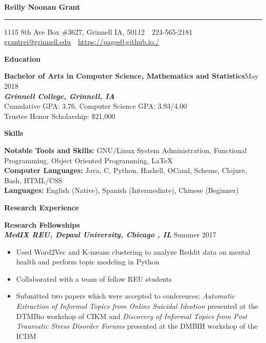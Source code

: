 \documentclass[9pt]{extarticle}
\begin{document}
\sffamily
\begin{huge}
\begin{center}
\textbf{Reilly Noonan Grant}
\end{center}
\end{huge}
\rule{19cm}{0.4pt}
\begin{center}
  1115 8th Ave Box \#3627, Grinnell IA, 50112
\,\textbullet\, 224-565-2181 \,\textbullet\, \href{mailto:grantrei@grinnell.edu}{grantrei@grinnell.edu} \,\textbullet\, \href{https://pages0.github.io./}{https://pages0.github.io./}
\end{center}

\begin{large}
\begin{center}\textbf{Education}
\end{center}
\end{large}
\textbf{Bachelor of Arts in Computer Science, Mathematics and Statistics}\hfill May 2018\\
\textbf{\textit{Grinnell College, Grinnell, IA}}\\
Cumulative GPA: 3.76, Computer Science GPA: 3.93/4.00  \\
Trustee Honor Scholarship: \$21,000 \\

\begin{large}
\begin{center}\textbf{Skills}
\end{center}
\end{large}
\textbf{Notable Tools and Skills:} GNU/Linux System Administration,
Functional Programming, Object Oriented Programming, \LaTeX  \\
\textbf{Computer Languages:} Java, C, Python, Haskell, OCaml, Scheme, Clojure, Bash,
HTML/CSS\\
\textbf{Languages:} English (Native), Spanish (Intermediate), Chinese
(Beginner) \\

\begin{large}
\begin{center}\textbf{Research Experience}
\end{center}
\end{large}
\textbf{Research Fellowships}\\
\textbf{\textit{MedIX REU, Depaul University, Chicago , IL}}
\hfill Summer 2017
\begin{itemize}
\item Used Word2Vec and K-means clustering to analyze Reddit data on
  mental health and perform topic modeling in Python
\item Collaborated with a team of fellow REU students
\item Submitted two papers which were accepted to conferences: \textit{Automatic
  Extraction of Informal Topics from Online Suicidal Ideation} 
presented at the
  DTMBio workshop of CIKM and \textit{Discovery of Informal Topics from Post Traumatic Stress
  Disorder Forums} presented at the DMBIH workshop of the ICDM 
\end{itemize}
\vspace{0.4cm}
\end{document}
